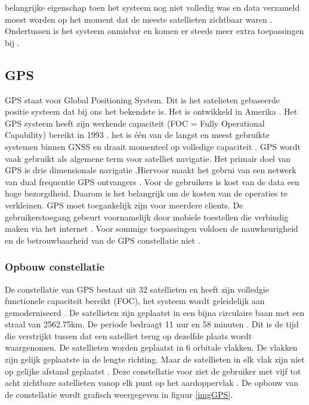 belangrijke eigenschap toen het systeem nog niet volledig was en data verzameld moest worden op het moment dat de meeste satellieten zichtbaar waren \cite{LBibGNSS7}. Ondertussen is het systeem onmisbar en komen er steeds meer extra toepassingen bij \cite{LBibGNSS8}.

\subsection{GPS}
\label{LGPS} 
GPS staat voor Global Positioning System. Dit is het satelieten gebaseerde positie systeem dat bij ons het bekendste is. Het is ontwikkeld in Amerika \cite{LBibGNSS}\cite{LBibGNSS3}. Het GPS systeem heeft zijn werkende capaciteit (FOC = Fully Operational Capability) bereikt in 1993 \cite{LBibGPS4}. het is \'e\'en van de langst en meest gebruikte systemen binnen GNSS en draait momenteel op volledige capaciteit \cite{LBibGNSS4,LBibGNSS8}. GPS wordt vaak gebruikt als algemene term voor satelliet navigatie. Het primair doel van GPS is drie dimensionale navigatie \cite{LBibGNSS8}.Hiervoor maakt het gebrui van een netwerk van dual frequentie GPS ontvangers \cite{LBibGPS5}. Voor de gebruikers is kost van de data een hoge bezorgdheid. Daarom is het belangrijk om de kosten van de operaties te verkleinen. GPS moet toegankelijk zijn voor meerdere clients. De gebruikerstoegang gebeurt voornamelijk door mobiele toestellen die verbindig maken via het internet \cite{LBibGPS}. Voor sommige toepassingen voldoen de nauwkeurigheid en de betrouwbaarheid van de GPS constellatie niet \cite{LBibGNSS6}.

\subsubsection{Opbouw constellatie}
 De constellatie van GPS bestaat uit 32 satellieten en heeft zijn volledgie functionele capaciteit bereikt (FOC), het systeem wordt geleidelijk aan gemoderniseerd \cite{LBibGNSS4}. De satellieten zijn geplaatst in een bijna circulaire baan met een straal van 2562.75km. De periode bedraagt 11 uur en 58 minuten \cite{LBibGNSS6,LBibGNSS8}. Dit is de tijd die verstrijkt tussen dat een satelliet terug op dezelfde plaats wordt waargenomen. De satellieten worden geplaatst in 6 orbitale vlakken. De vlakken zijn gelijk geplaatste in de lengte richting. Maar de satellieten in elk vlak zijn niet op gelijke afstand geplaatst \cite{LBibGNSS6}. Deze constellatie voor ziet de gebruiker met vijf tot acht zichtbare satellieten vanop elk punt op het aardoppervlak \cite{LBibGNSS8}. De opbouw van de constellatie wordt grafisch weergegeven in figuur \ref{imgGPS}.
 
